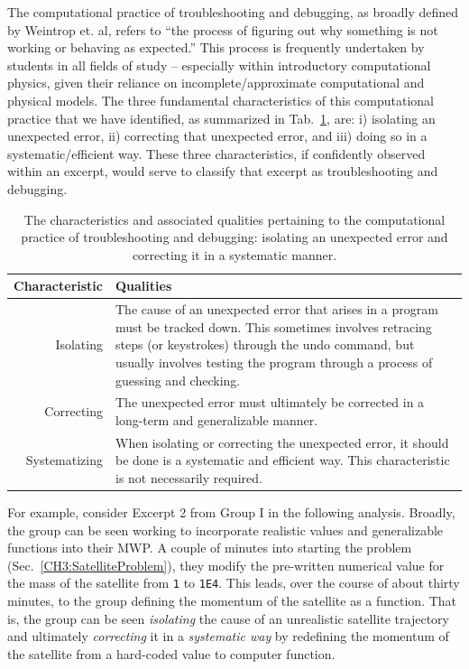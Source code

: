 \documentclass{msuphddissertation}
\begin{document}
\begin{doublespace}
The computational practice of troubleshooting and debugging, as broadly defined by Weintrop et. al, refers to ``the process of figuring out why something is not working or behaving as expected.''  This process is frequently undertaken by students in all fields of study -- especially within introductory computational physics, given their reliance on incomplete/approximate computational and physical models.  The three fundamental characteristics of this computational practice that we have identified, as summarized in Tab.~\ref{CH5:TroubleshootingAndDebugging}, are: i) isolating an unexpected error, ii) correcting that unexpected error, and iii) doing so in a systematic/efficient way.  These three characteristics, if confidently observed within an excerpt, would serve to classify that excerpt as troubleshooting and debugging.

\begin{table}
\begin{tabular}{r|p{}}
Characteristic & Qualities \\\hline\hline
Isolating & The cause of an unexpected error that arises in a program must be tracked down.  This sometimes involves retracing steps (or keystrokes) through the undo command, but usually involves testing the program through a process of guessing and checking.\\
Correcting & The unexpected error must ultimately be corrected in a long-term and generalizable manner.\\
Systematizing & When isolating or correcting the unexpected error, it should be done is a systematic and efficient way.  This characteristic is not necessarily required.\\
\end{tabular}\caption{The characteristics and associated qualities pertaining to the computational practice of troubleshooting and debugging: isolating an unexpected error and correcting it in a systematic manner.}\label{CH5:TroubleshootingAndDebugging}
\end{table}

For example, consider Excerpt 2 from Group I in the following analysis.  Broadly, the group can be seen working to incorporate realistic values and generalizable functions into their MWP.  A couple of minutes into starting the problem (Sec.~\ref{CH3:SatelliteProblem}), they modify the pre-written numerical value for the mass of the satellite from \texttt{1} to \texttt{1E4}.  This leads, over the course of about thirty minutes, to the group defining the momentum of the satellite as a function.  That is, the group can be seen \textit{isolating} the cause of an unrealistic satellite trajectory and ultimately \textit{correcting} it in a \textit{systematic way} by redefining the momentum of the satellite from a hard-coded value to computer function.


\end{doublespace}
\end{document}
